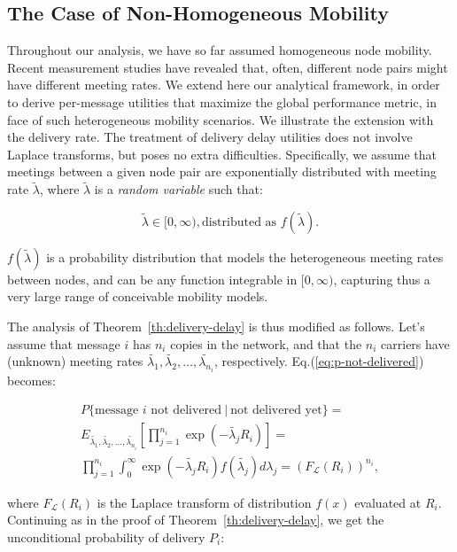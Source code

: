 \subsection{The Case of Non-Homogeneous Mobility}
\label{section:heterogeneous-mobility}

Throughout our analysis, we have so far assumed homogeneous node mobility. Recent measurement studies have revealed that, often, different node pairs might have different meeting rates. We extend here our analytical framework, in order to derive per-message utilities that maximize the global performance metric, in face of such heterogeneous mobility scenarios. We illustrate the extension with the delivery rate. The treatment of delivery delay utilities does not involve Laplace transforms, but poses no extra difficulties. Specifically, we assume that meetings between a given node pair are exponentially distributed with meeting rate $\tilde{\lambda}$, where $\tilde{\lambda}$ is a \emph{random variable} such that:

\begin{equation*}
\tilde{\lambda} \in [0,\infty), \mbox{distributed as } f(\tilde{\lambda}).
\end{equation*}

$f(\tilde{\lambda})$ is a probability distribution that models the heterogeneous meeting rates between nodes, and can be any function integrable in $[0,\infty)$, capturing thus a very large range of conceivable mobility models.

The analysis of Theorem~\ref{th:delivery-delay} is thus modified as follows. Let's assume that message $i$ has $n_{i}$ copies in the network, and that the $n_{i}$ carriers have (unknown) meeting rates $\tilde{\lambda_{1}},\tilde{\lambda_{2}},\dots,\tilde{\lambda_{n_{i}}}$, respectively. Eq.(\ref{eq:p-not-delivered}) becomes:

\begin{eqnarray}
P\{\mbox{message\ $i$ not\ delivered}\ |\ \mbox{not\ delivered\ yet}  \}= \nonumber \\
E_{\tilde{\lambda_{1}},\tilde{\lambda_{2}},\dots,\tilde{\lambda_{n_{i}}}} [ \prod_{j=1}^{n_i}\exp(-\tilde{\lambda_{j}} R_i ) ] = \\
\prod_{j=1}^{n_i} \int_{0}^{\infty} \exp(-\tilde{\lambda_{j}} R_i ) f(\tilde{\lambda_{j}}) d\lambda_{j}  = (F_{\mathcal{L}}(R_{i}))^{n_{i}}, \label{eq:conditional-delivery}
\end{eqnarray}

where $F_{\mathcal{L}}(R_{i})$ is the Laplace transform of distribution $f(x)$ evaluated at $R_{i}$. Continuing as in the proof of Theorem~\ref{th:delivery-delay}, we get the unconditional probability of delivery $P_{i}$:


